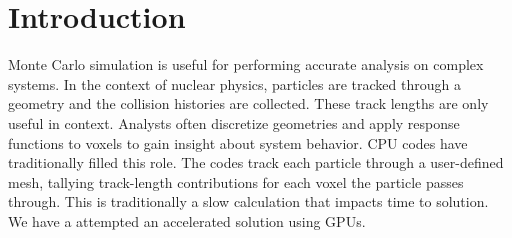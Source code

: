 
\section{Introduction}
    Monte Carlo simulation is useful for performing accurate analysis on complex
systems. In the context of nuclear physics, particles are tracked through a
geometry and the collision histories are collected. These track lengths are only useful in
context. Analysts often discretize geometries and apply response functions to
voxels to gain insight about system behavior. CPU codes have traditionally
filled this role. The codes track each particle through a user-defined mesh,
tallying track-length contributions for each voxel the particle passes through.
This is traditionally a slow calculation that impacts time to solution. We have
a attempted an accelerated solution using GPUs.
